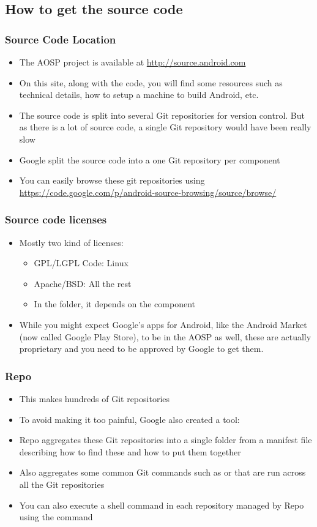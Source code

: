 \subsection{How to get the source code}
\begin{frame}
  \frametitle{Source Code Location}
  \begin{itemize}
  \item The AOSP project is available at
    \url{http://source.android.com}
  \item On this site, along with the code, you will find some resources
    such as technical details, how to setup a machine to build
    Android, etc.
  \item The source code is split into several Git repositories for
    version control. But as there is a lot of source code, a single
    Git repository would have been really slow
  \item Google split the source code into a one Git repository per
    component
  \item You can easily browse these git repositories using
    \url{https://code.google.com/p/android-source-browsing/source/browse/}
  \end{itemize}
\end{frame}

\begin{frame}
  \frametitle{Source code licenses}
  \begin{itemize}
  \item Mostly two kind of licenses:
    \begin{itemize}
    \item GPL/LGPL Code: Linux
    \item Apache/BSD: All the rest
    \item In the  folder, it depends on the component
    \end{itemize}
  \item While you might expect Google's apps for Android, like the
    Android Market (now called Google Play Store), to be in the AOSP
    as well, these are actually proprietary and you need to be
    approved by Google to get them.
  \end{itemize}
\end{frame}

\begin{frame}
  \frametitle{Repo}
  \begin{itemize}
  \item This makes hundreds of Git repositories\!
  \item To avoid making it too painful, Google also created a tool:
  \item Repo aggregates these Git repositories into a single folder
    from a manifest file describing how to find these and how to put
    them together
  \item Also aggregates some common Git commands such as 
    or  that are run across all the Git repositories
  \item You can also execute a shell command in each repository
    managed by Repo using the  command
  \end{itemize}
\end{frame}

